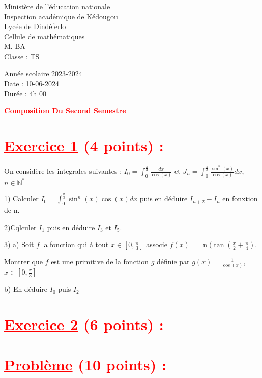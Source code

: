 \documentclass[12pt]{article}
\begin{document}
\begin{minipage}{0.5\textwidth}
	Ministère de l'éducation nationale  \\
	Inspection académique de Kédougou   \\
	Lycée de Dindéferlo            \\
	Cellule de mathématiques            \\
	M. BA                          \\
	Classe : TS  \\
\end{minipage}
\begin{minipage}{0.5\textwidth}
	Année scolaire 2023-2024 \\
	Date : 10-06-2024 \\
	Durée : 4h 00 \\
\end{minipage}

\begin{center}
	\textbf{{\underline{\textcolor{red}{Composition Du Second Semestre}}}}
\end{center}

\section*{\textcolor{red}{\underline{Exercice 1} (4 points) :}}
On considère les integrales suivantes : $I_{0}=\int_{0}^{\frac{\pi}{3}}\frac{dx}{\cos (x)}$ et $J_{n}=\int_{0}^{\frac{\pi}{3}}\frac{\sin^{n}(x)}{\cos(x)}dx,$ $n\in\mathbb{N}^{*}$

1) Calculer $I_{0}=\int_{0}^{\frac{\pi}{3}}\sin^{n}(x)\cos(x)dx$  puis en déduire $I_{n+2}-I_{n}$ en fonxtion de  n.

2)Cqlculer $I_{1}$ puis en déduire $I_{3}$ et $I_{5}$.

3) a) Soit $f$ la fonction qui à tout $x\in\left[0, \frac{\pi}{3}\right]$ associe $f(x)=\ln(\tan\left(\frac{x}{2}+\frac{\pi}{4}\right).$

Montrer que  $f$ est une primitive de la fonction $g$ définie par $g(x)=\frac{1}{\cos(x)}$, $x\in\left[0, \frac{\pi}{3}\right]$

b) En déduire $I_{0}$ puis $I_{2}$
\section*{\textcolor{red}{\underline{Exercice 2} (6 points) :}}

\section*{\textcolor{red}{\underline{Problème} (10 points) :}}
\end{document}
